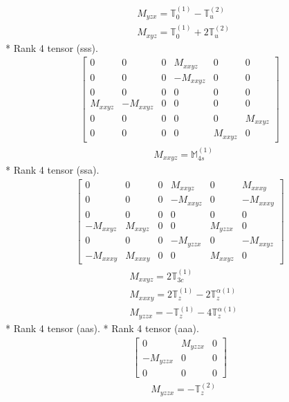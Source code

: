 \documentclass[fleqn,8pt,landscape]{jsarticle}
\begin{document}
\begin{align*}
& M_{yzx} = \mathbb{T}_{0}^{(1)} - \mathbb{T}_{u}^{(2)} \\
& M_{xyz} = \mathbb{T}_{0}^{(1)} + 2 \mathbb{T}_{u}^{(2)}
\end{align*}
* Rank 4 tensor (sss).
\begin{align*}
\begin{bmatrix} 0 & 0 & 0 & M_{xxyz} & 0 & 0 \\ 0 & 0 & 0 & - M_{xxyz} & 0 & 0 \\ 0 & 0 & 0 & 0 & 0 & 0 \\ M_{xxyz} & - M_{xxyz} & 0 & 0 & 0 & 0 \\ 0 & 0 & 0 & 0 & 0 & M_{xxyz} \\ 0 & 0 & 0 & 0 & M_{xxyz} & 0 \end{bmatrix}
\end{align*}
\begin{align*}
& M_{xxyz} = \mathbb{M}_{4s}^{(1)}
\end{align*}
* Rank 4 tensor (ssa).
\begin{align*}
\begin{bmatrix} 0 & 0 & 0 & M_{xxyz} & 0 & M_{xxxy} \\ 0 & 0 & 0 & - M_{xxyz} & 0 & - M_{xxxy} \\ 0 & 0 & 0 & 0 & 0 & 0 \\ - M_{xxyz} & M_{xxyz} & 0 & 0 & M_{yzzx} & 0 \\ 0 & 0 & 0 & - M_{yzzx} & 0 & - M_{xxyz} \\ - M_{xxxy} & M_{xxxy} & 0 & 0 & M_{xxyz} & 0 \end{bmatrix}
\end{align*}
\begin{align*}
& M_{xxyz} = 2 \mathbb{T}_{3c}^{(1)} \\
& M_{xxxy} = 2 \mathbb{T}_{z}^{(1)} - 2 \mathbb{T}_{z}^{\alpha(1)} \\
& M_{yzzx} = - \mathbb{T}_{z}^{(1)} - 4 \mathbb{T}_{z}^{\alpha(1)}
\end{align*}
* Rank 4 tensor (aas).
* Rank 4 tensor (aaa).
\begin{align*}
\begin{bmatrix} 0 & M_{yzzx} & 0 \\ - M_{yzzx} & 0 & 0 \\ 0 & 0 & 0 \end{bmatrix}
\end{align*}
\begin{align*}
& M_{yzzx} = - \mathbb{T}_{z}^{(2)}
\end{align*}
\end{document}
